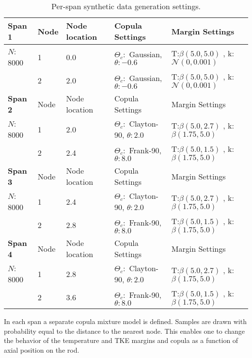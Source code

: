 \begin{table}[h]
    \begin{center}
        \caption{Per-span synthetic data generation settings.}
        \begin{tabular}{|l|l|l|l|l|}
            \hline
            \bf Span 1 & Node & Node location & Copula Settings  & Margin Settings \\
            \hline
            $N$: 8000  & 1  & 0.0 & $\Theta_c:$ Gaussian, $\theta:-0.6$ &  T:$\beta(5.0, 5.0)$ , k: $\mathcal{N}(0, 0.001)$ \\
                   & 2  & 2.0 & $\Theta_c:$ Gaussian, $\theta:-0.6$ &  T:$\beta(5.0, 5.0)$ , k: $\mathcal{N}(0, 0.001)$   \\     
            \hline \hline
            \bf Span 2 & Node & Node location & Copula Settings  & Margin Settings \\
            \hline
             $N$: 8000 & 1  & 2.0 & $\Theta_c:$ Clayton-90, $\theta: 2.0$ &  T:$\beta(5.0, 2.7)$ , k: $\beta(1.75, 5.0)$ \\
            & 2  & 2.4 & $\Theta_c:$ Frank-90, $\theta: 8.0$ &  T:$\beta(5.0, 1.5)$ , k: $\beta(1.75, 5.0)$   \\     
            \hline \hline
            \bf Span 3 & Node & Node location & Copula Settings  & Margin Settings \\
            \hline
             $N$: 8000 & 1  & 2.4 & $\Theta_c:$ Clayton-90, $\theta: 2.0$ &  T:$\beta(5.0, 2.7)$ , k: $\beta(1.75, 5.0)$ \\
            & 2  & 2.8 & $\Theta_c:$ Frank-90, $\theta: 8.0$ &  T:$\beta(5.0, 1.5)$ , k: $\beta(1.75, 5.0)$   \\      
            \hline \hline
            \bf Span 4 & Node & Node location & Copula Settings  & Margin Settings \\
            \hline
            $N$: 8000 & 1  & 2.8 & $\Theta_c:$ Clayton-90, $\theta: 2.0$ &  T:$\beta(5.0, 2.7)$ , k: $\beta(1.75, 5.0)$ \\
            & 2  & 3.6 & $\Theta_c:$ Frank-90, $\theta: 8.0$ &  T:$\beta(5.0, 1.5)$ , k: $\beta(1.75, 5.0)$   \\     
            \hline      
        \end{tabular}
        \label{tab:synth_settings}
    \end{center}
\end{table}

In each span a separate copula mixture model is defined.  Samples are drawn with probability equal to the distance to the nearest node.  This enables one to change the behavior of the temperature and TKE margins and copula as a function of axial position on the rod.

